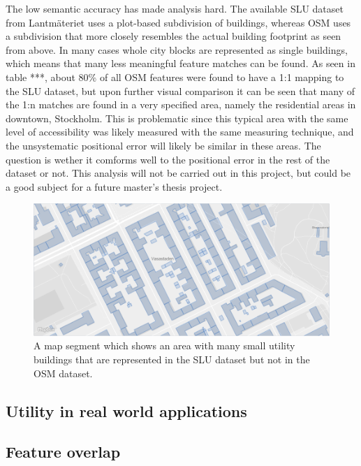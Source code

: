 \documentclass[a4paper]{article}
\begin{document}
The low semantic accuracy has made analysis hard. The available SLU dataset from Lantmäteriet uses a plot-based subdivision of buildings, whereas OSM uses a subdivision that more closely resembles the actual building footprint as seen from above. In many cases whole city blocks are represented as single buildings, which means that many less meaningful feature matches can be found.
As seen in table ***, about 80\% of all OSM features were found to have a 1:1 mapping to the SLU dataset, but upon further visual comparison it can be seen that many of the 1:n matches are found in a very specified area, namely the residential areas in downtown, Stockholm. This is problematic since this typical area with the same level of accessibility was likely measured with the same measuring technique, and the unsystematic positional error will likely be similar in these areas. The question is wether it comforms well to the positional error in the rest of the dataset or not. This analysis will not be carried out in this project, but could be a good subject for a future master's thesis project.

\begin{figure}[H]
    \centering
    \includegraphics[width=\textwidth,height=0.5\textheight,keepaspectratio]{img_map_utility_buildings}
    \caption{A map segment which shows an area with many small utility buildings that are represented in the SLU dataset but not in the OSM dataset.}
    \label{fig:space}
\end{figure}

\subsection{Utility in real world applications}


\subsection{Feature overlap}
\end{document}
